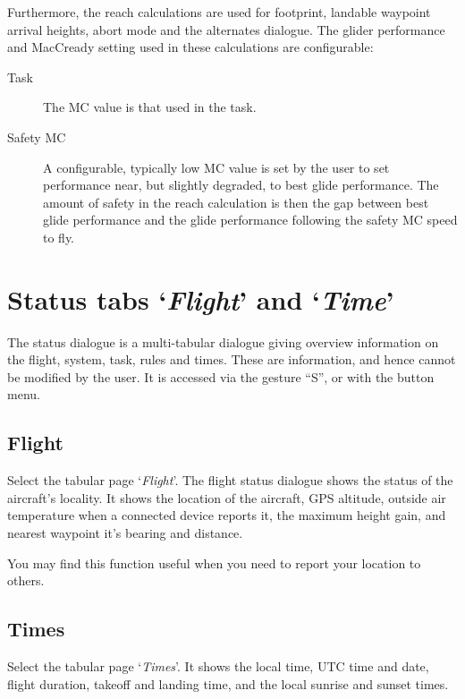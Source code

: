 Furthermore, the reach calculations are used for footprint, landable
waypoint arrival heights, abort mode and the alternates dialogue.  The glider
performance and MacCready setting used in these calculations are configurable:
\begin{description}
\item[Task] The MC value is that used in the task.
\item[Safety MC] A configurable, typically low MC value is set by the user to set
  performance near, but slightly degraded, to best glide performance. The amount of safety 
  in the reach calculation is then the gap between best glide performance and the glide
  performance following the safety MC speed to fly. 
\end{description}

\section{Status tabs `\emph{Flight}' and `\emph{Time}'}\label{sec:flight-status}

The status dialogue is a multi-tabular dialogue giving overview information on the 
flight, system, task, rules and times.
These are information, and hence cannot be modified by the user.
It is accessed via the gesture ``S'', or with the button menu.
\begin{quote}
\blink{}
\end{quote}

\subsection*{Flight}
Select the tabular page `\emph{Flight}'. 
The flight status dialogue shows the status of the aircraft's locality.
It shows the location of the aircraft, GPS altitude, outside air
temperature when a connected device reports it, the
maximum height gain, and nearest waypoint it's bearing and distance.

You may find this function useful when you need to report your
location to others.

\subsection*{Times}\label{sec:time-status}
Select the tabular page `\emph{Times}'. 
It shows the local time, UTC time and date, flight duration, takeoff and landing time, and
the local sunrise and sunset times.


